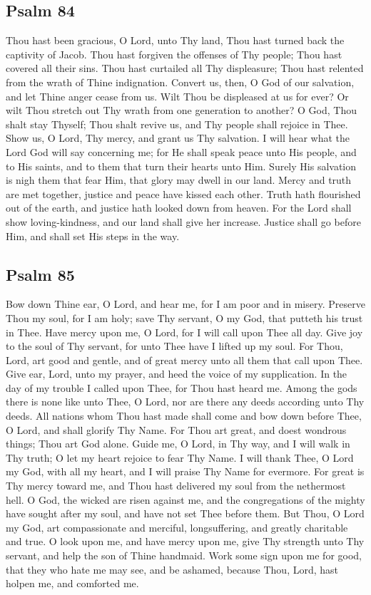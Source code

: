 \subsection{Psalm 84}

Thou hast been gracious, O Lord, unto Thy land, Thou hast turned back the captivity of Jacob. Thou hast forgiven the offenses of Thy people; Thou hast covered all their sins. Thou hast curtailed all Thy displeasure; Thou hast relented from the wrath of Thine indignation. Convert us, then, O God of our salvation, and let Thine anger cease from us. Wilt Thou be displeased at us for ever? Or wilt Thou stretch out Thy wrath from one generation to another? O God, Thou shalt stay Thyself; Thou shalt revive us, and Thy people shall rejoice in Thee. Show us, O Lord, Thy mercy, and grant us Thy salvation. I will hear what the Lord God will say concerning me; for He shall speak peace unto His people, and to His saints, and to them that turn their hearts unto Him. Surely His salvation is nigh them that fear Him, that glory may dwell in our land. Mercy and truth are met together, justice and peace have kissed each other. Truth hath flourished out of the earth, and justice hath looked down from heaven. For the Lord shall show loving-kindness, and our land shall give her increase. Justice shall go before Him, and shall set His steps in the way.

\subsection{Psalm 85}

Bow down Thine ear, O Lord, and hear me, for I am poor and in misery. Preserve Thou my soul, for I am holy; save Thy servant, O my God, that putteth his trust in Thee. Have mercy upon me, O Lord, for I will call upon Thee all day. Give joy to the soul of Thy servant, for unto Thee have I lifted up my soul. For Thou, Lord, art good and gentle, and of great mercy unto all them that call upon Thee. Give ear, Lord, unto my prayer, and heed the voice of my supplication. In the day of my trouble I called upon Thee, for Thou hast heard me. Among the gods there is none like unto Thee, O Lord, nor are there any deeds according unto Thy deeds. All nations whom Thou hast made shall come and bow down before Thee, O Lord, and shall glorify Thy Name. For Thou art great, and doest wondrous things; Thou art God alone. Guide me, O Lord, in Thy way, and I will walk in Thy truth; O let my heart rejoice to fear Thy Name. I will thank Thee, O Lord my God, with all my heart, and I will praise Thy Name for evermore. For great is Thy mercy toward me, and Thou hast delivered my soul from the nethermost hell. O God, the wicked are risen against me, and the congregations of the mighty have sought after my soul, and have not set Thee before them. But Thou, O Lord my God, art compassionate and merciful, longsuffering, and greatly charitable and true. O look upon me, and have mercy upon me, give Thy strength unto Thy servant, and help the son of Thine handmaid. Work some sign upon me for good, that they who hate me may see, and be ashamed, because Thou, Lord, hast holpen me, and comforted me.

